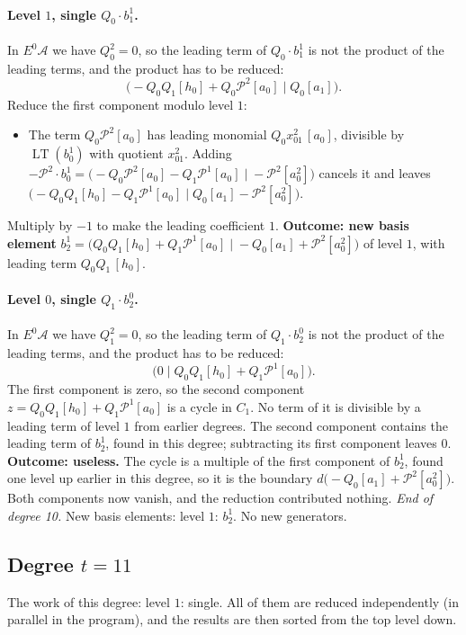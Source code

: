 \documentclass[11pt]{article}
\renewcommand{\P}{\mathcal{P}}
\newcommand{\A}{\mathcal{A}}
\DeclareMathOperator{\LT}{LT}
\begin{document}
\paragraph{Level $1$, single $Q_{0}\cdot b^{1}_{1}$.} In $E^0\A$ we have $Q_{0}^2 = 0$, so the leading term of $Q_{0}\cdot b^{1}_{1}$ is not the product of the leading terms, and the product has to be reduced:
\[\bigl(-Q_{0}Q_{1}[h_0] + Q_{0}\P^{2}[a_0] \;\big|\; Q_{0}[a_1]\bigr).\]
Reduce the first component modulo level $1$:
\begin{itemize}
\item The term $Q_{0}\P^{2}[a_0]$ has leading monomial $Q_{0}x_{01}^{2}\,[a_0]$, divisible by $\LT(b^{1}_{0})$ with quotient $x_{01}^{2}$. Adding $-\P^{2}\cdot b^{1}_{0} = \bigl(-Q_{0}\P^{2}[a_0] - Q_{1}\P^{1}[a_0] \;\big|\; -\P^{2}[a_0^2]\bigr)$ cancels it and leaves $\bigl(-Q_{0}Q_{1}[h_0] - Q_{1}\P^{1}[a_0] \;\big|\; Q_{0}[a_1] - \P^{2}[a_0^2]\bigr)$.
\end{itemize}
Multiply by $-1$ to make the leading coefficient $1$.
\textbf{Outcome: new basis element} $b^{1}_{2} = \bigl(Q_{0}Q_{1}[h_0] + Q_{1}\P^{1}[a_0] \;\big|\; -Q_{0}[a_1] + \P^{2}[a_0^2]\bigr)$ of level $1$, with leading term $Q_{0}Q_{1}\,[h_0]$.
\medskip
\paragraph{Level $0$, single $Q_{1}\cdot b^{0}_{2}$.} In $E^0\A$ we have $Q_{1}^2 = 0$, so the leading term of $Q_{1}\cdot b^{0}_{2}$ is not the product of the leading terms, and the product has to be reduced:
\[\bigl(0 \;\big|\; Q_{0}Q_{1}[h_0] + Q_{1}\P^{1}[a_0]\bigr).\]
The first component is zero, so the second component $z = Q_{0}Q_{1}[h_0] + Q_{1}\P^{1}[a_0]$ is a cycle in $C_{1}$.
No term of it is divisible by a leading term of level $1$ from earlier degrees.
The second component contains the leading term of $b^{1}_{2}$, found in this degree; subtracting its first component leaves $0$.
\textbf{Outcome: useless.} The cycle is a multiple of the first component of $b^{1}_{2}$, found one level up earlier in this degree, so it is the boundary $d\bigl(-Q_{0}[a_1] + \P^{2}[a_0^2]\bigr)$. Both components now vanish, and the reduction contributed nothing.
\medskip\noindent\emph{End of degree 10.} New basis elements: level $1$: $b^{1}_{2}$. No new generators.
\subsection*{Degree $t = 11$}
\noindent The work of this degree: level $1$: single. All of them are reduced independently (in parallel in the program), and the results are then sorted from the top level down.
\medskip
\end{document}
